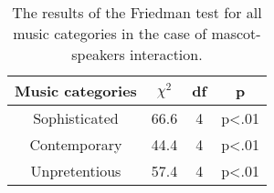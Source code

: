 \begin{table}[hbt!]
    \renewcommand{\arraystretch}{1}
    \begin{center}
        \begin{tabular}{|c|c|c|c|}
            \hline
            \textbf{Music categories} & \textbf{$\chi^2$} & \textbf{df} & \textbf{p} \\
            \hline
            Sophisticated &66.6 &4 &p<.01 \\
            \hline
            Contemporary &44.4 &4 &p<.01\\
            \hline
            Unpretentious &57.4 &4 &p<.01 \\
            \hline
        \end{tabular}
        \caption{The results of the Friedman test for all music categories in the case of mascot-speakers interaction.}
        \label{table:friedmanMS2}
    \end{center}
\end{table}

